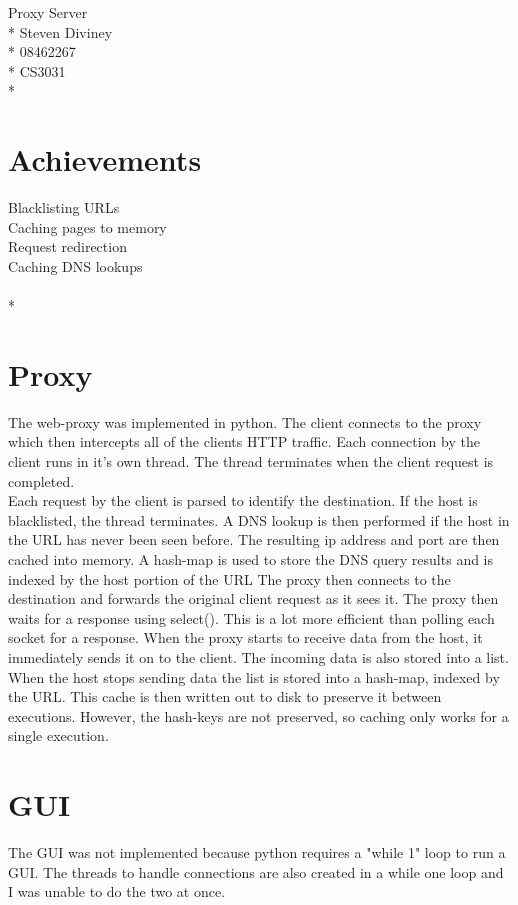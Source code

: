 \documentclass[a4paper,12pt]{article}
\begin{document}
\begin{center}
  {\large Proxy Server} \\*
    Steven Diviney \\*
    08462267 \\*
    CS3031 \\*
\end{center}
\section{Achievements}
Blacklisting URLs\\
Caching pages to memory\\
Request redirection\\
Caching DNS lookups\\
\\*
\section{Proxy}
The web-proxy was implemented in python. The client connects to the proxy which then intercepts all of the clients HTTP traffic. 
Each connection by the client runs in it's own thread. The thread terminates when the client request is completed.\\
Each request by the client is parsed to identify the destination.
If the host is blacklisted, the thread terminates.
A DNS lookup is then performed if the host in the URL has never been seen before.
The resulting ip address and port are then cached into memory.
A hash-map is used to store the DNS query results and is indexed by the host portion of the URL
The proxy then connects to the destination and forwards the original client request as it sees it. The proxy then waits for a response using select().
This is a lot more efficient than polling each socket for a response. 
When the proxy starts to receive data from the host, it immediately sends it on to the client.
The incoming data is also stored into a list.
When the host stops sending data the list is stored into a hash-map, indexed by the URL.
This cache is then written out to disk to preserve it between executions.
However, the hash-keys are not preserved, so caching only works for a single execution.
\section{GUI}
The GUI was not implemented because python requires a "while 1" loop to run a GUI. The threads to handle connections are also created in a while one loop and I was unable to do the two at once.
\end{document}
